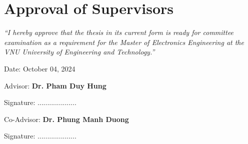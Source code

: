 \chapter*{Approval of Supervisors}

\textit{``I hereby approve that the thesis in its current form is ready for committee examination as a requirement for the Master of Electronics Engineering at the VNU University of Engineering and Technology.''}
\vspace{1cm}

\begin{flushleft}
    Date: October 04, 2024\quad\par

    Advisor: \textbf{Dr. Pham Duy Hung}
    
    \vspace{0.5cm}
    Signature: ....................

    Co-Advisor: \textbf{Dr. Phung Manh Duong}

    \vspace{0.5cm}
    Signature: ....................
\end{flushleft}